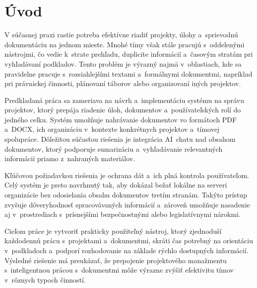 \chapter*{Úvod}

        V súčasnej praxi rastie potreba efektívne riadiť projekty, úlohy a~sprievodnú
dokumentáciu na jednom mieste. Mnohé tímy však stále pracujú s~oddelenými nástrojmi, čo
vedie k~strate prehľadu, duplicite informácií a~časovým stratám pri vyhľadávaní podkladov.
Tento problém je výrazný najmä v~oblastiach, kde sa pravidelne pracuje s~rozsiahlejšími
textami a~formálnymi dokumentmi, napríklad pri právnickej činnosti, plánovaní táborov
alebo organizovaní iných projektov.

        Predkladaná práca sa zameriava na návrh a~implementáciu systému na správu projektov,
ktorý prepája riadenie úloh, dokumentov a~používateľských rolí do jedného celku.
Systém umožňuje nahrávanie dokumentov vo formátoch PDF a~DOCX, ich organizáciu v~kontexte
konkrétnych projektov a~tímovej spolupráce. Dôležitou súčasťou riešenia je integrácia
AI~chatu nad obsahom dokumentov, ktorý podporuje sumarizáciu a~vyhľadávanie relevantných
informácií priamo z~nahraných materiálov.

        Kľúčovou požiadavkou riešenia je ochrana dát a~ich plná kontrola používateľom.
Celý systém je preto navrhnutý tak, aby dokázal bežať lokálne na serveri organizácie
bez odosielania obsahu dokumentov tretím stranám. Takýto prístup zvyšuje dôveryhodnosť
spracovávaných informácií a~zároveň umožňuje nasadenie aj v~prostrediach s~prísnejšími
bezpečnostnými alebo legislatívnymi nárokmi.

        Cieľom práce je vytvoriť prakticky použiteľný nástroj, ktorý zjednoduší každodennú
prácu s~projektami a~dokumentmi, skráti čas potrebný na orientáciu v~podkladoch
a~podporí rozhodovanie na základe rýchlo dostupných informácií. Výsledné riešenie má
preukázať, že prepojenie projektového manažmentu s~inteligentnou prácou s~dokumentmi
môže výrazne zvýšiť efektivitu tímov v~rôznych typoch činností.
